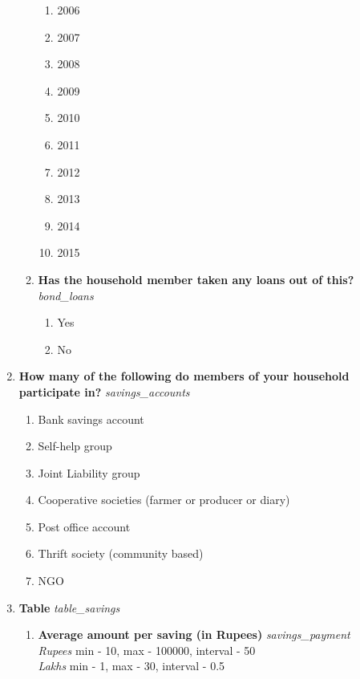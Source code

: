 \documentclass{article}
\begin{document}
\begin{enumerate}
\begin{enumerate}[label*=\arabic*.]
\begin{enumerate}
\item 2006 
\item 2007 
\item 2008 
\item 2009 
\item 2010 
\item 2011 
\item 2012 
\item 2013 
\item 2014 
\item 2015 
\end{enumerate} 
\item {\bfseries Has the household member taken any loans out of this?}\emph{ bond\_loans } 
\begin{enumerate} 
\item Yes 
\item No 
\end{enumerate} 
\end{enumerate} 
\item {\bfseries How many of the following do members of your household participate in?}\emph{ savings\_accounts } 
\begin{enumerate} 
\item Bank savings account 
\item Self-help group 
\item Joint Liability group 
\item Cooperative societies (farmer or producer or diary) 
\item Post office account 
\item Thrift society (community based) 
\item NGO 
\end{enumerate} 
\item {\bfseries Table}\emph{ table\_savings } 
\begin{enumerate}[label*=\arabic*.] 
\item {\bfseries Average amount per saving (in Rupees)}\emph{ savings\_payment } 
\\ \emph{ Rupees }min - 10, max - 100000, interval - 50 
\\ \emph{ Lakhs }min - 1, max - 30, interval - 0.5 
 

\end{enumerate}
\end{enumerate}
\end{document}
